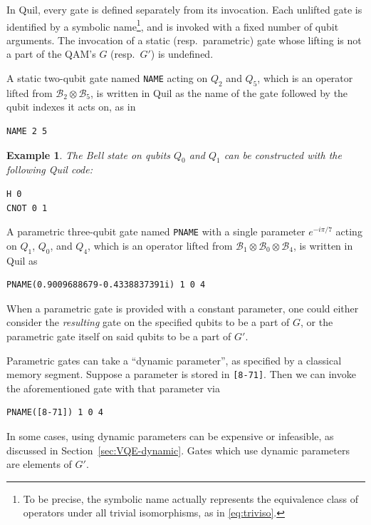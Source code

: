 \documentclass[conference]{IEEEtran}
\newcommand{\defn}[1]{\textbf{#1}}
\newcommand{\BHil}{\ensuremath{\mathscr{B}}}
\newtheorem{example}{Example}
\begin{document}
In Quil, every gate is defined separately from its invocation. Each unlifted gate is identified by a symbolic name\footnote{To be precise, the symbolic name actually represents the equivalence class of operators under all trivial isomorphisms, as in \eqref{eq:triviso}.}, and is invoked with a fixed number of qubit arguments. The invocation of a static (resp.\ parametric) gate whose lifting is not a part of the QAM's $G$ (resp.\ $G'$) is undefined.

A static two-qubit gate named \verb|NAME| acting on $Q_2$ and $Q_5$, which is an operator lifted from $\BHil_2\otimes\BHil_5$, is written in Quil as the name of the gate followed by the qubit indexes it acts on, as in
\begin{verbatim}
NAME 2 5
\end{verbatim}
\begin{example}\label{ex:bell}
The Bell state on qubits $Q_0$ and $Q_1$ can be constructed with the following Quil code:
\begin{verbatim}
H 0
CNOT 0 1
\end{verbatim}
\end{example}

A parametric three-qubit gate named \verb|PNAME| with a single parameter $e^{-i\pi/7}$ acting on $Q_1$, $Q_0$, and $Q_4$, which is an operator lifted from $\BHil_1\otimes\BHil_0\otimes\BHil_4$, is written in Quil as
\begin{verbatim}
PNAME(0.9009688679-0.4338837391i) 1 0 4
\end{verbatim}
When a parametric gate is provided with a constant parameter, one could either consider the \emph{resulting} gate on the specified qubits to be a part of $G$, or the parametric gate itself on said qubits to be a part of $G'$.

Parametric gates can take a ``dynamic parameter'', as specified by a classical memory segment. Suppose a parameter is stored in \verb|[8-71]|. Then we can invoke the aforementioned gate with that parameter via
\begin{verbatim}
PNAME([8-71]) 1 0 4
\end{verbatim}
In some cases, using dynamic parameters can be expensive or infeasible, as discussed in Section~\ref{sec:VQE-dynamic}. Gates which use dynamic parameters are elements of $G'$.
\end{document}
